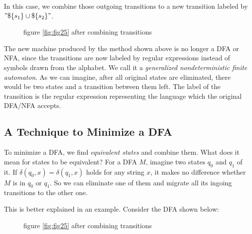 \documentclass[11pt]{article}
\begin{document}
In this case, we combine those outgoing transitions to a new transition
labeled by $"\$\{s_1\}\cup\$\{s_2\}"$.

\begin{figure}[ht]
    \centering
    \caption{figure \ref{fig:fig25} after combining transitions}
    \label{fig:fig26}
\end{figure}

The new machine produced by the method shown above is no longer a DFA
or NFA, since the transitions are now labeled by regular expressions
instead of symbols drawn from the alphabet. We call it a \emph{generalized
nondeterministic finite automaton}. As we can imagine, after all original
states are eliminated, there would be two states and a transition between
them left. The label of the transition is the regular expression
representing the language which the original DFA/NFA accepts.

\subsection{A Technique to Minimize a DFA} \label{subsec:6.3}

To minimize a DFA, we find \emph{equivalent states} and combine them.
What does it mean for states to be equivalent? For a DFA $M$, imagine
two states $q_0$ and $q_1$ of it. If $\delta(q_0, x) = \delta(q_1, x)$
holds for any string $x$, it makes no difference whether $M$ is in $q_0$
or $q_1$. So we can eliminate one of them and migrate all its ingoing
transitions to the other one.

This is better explained in an example. Consider the DFA shown below:

\begin{figure}[ht]
    \centering
    \caption{figure \ref{fig:fig25} after combining transitions}
    \label{fig:fig27}
\end{figure}
\end{document}
